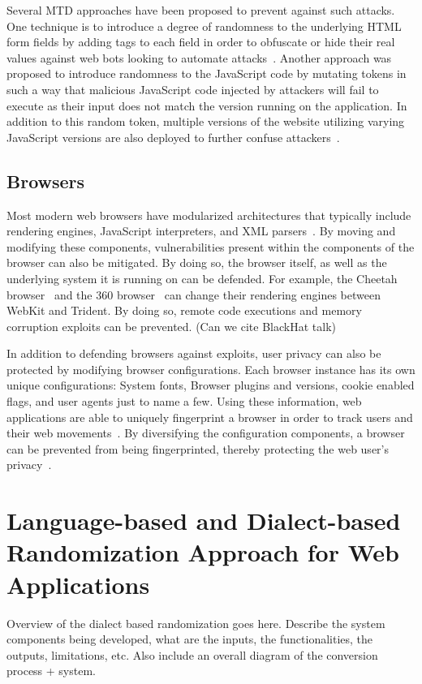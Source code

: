 Several MTD approaches have been proposed to prevent against such attacks. One technique is to introduce a degree of randomness to the underlying HTML form fields by adding tags to each field in order to obfuscate or hide their real values against web bots looking to automate attacks~\cite{vikram2013}.
Another approach was proposed to introduce randomness to the JavaScript code by mutating tokens in such a way that malicious JavaScript code injected by attackers will fail to execute as their input does not match the version running on the application. In addition to this random token, multiple versions of the website utilizing varying JavaScript versions are also deployed to further confuse attackers~\cite{portner2014}.

\subsection{Browsers}
Most modern web browsers have modularized architectures that typically include rendering engines, JavaScript interpreters, and XML parsers~\cite{reis2009browser}.
By moving and modifying these components, vulnerabilities present within the components of the browser can also be mitigated. By doing so, the browser itself, as well as the underlying system it is running on can be defended. For example, the Cheetah browser~\cite{BrowserCheetah} and the 360 browser~\cite{Browser360} can change their rendering engines between WebKit and Trident. By doing so, remote code executions and memory corruption exploits can be prevented. (Can we cite BlackHat talk)%

In addition to defending browsers against exploits, user privacy can also be protected by modifying browser configurations. 
Each browser instance has its own unique configurations: System fonts, Browser plugins and versions, cookie enabled flags, and user agents just to name a few. Using these information, web applications are able to uniquely fingerprint a browser in order to track users and their web movements~\cite{eckersley2010unique}. 
By diversifying the configuration components, a browser can be prevented from being fingerprinted, thereby protecting the web user's privacy~\cite{laperdrixmitigating,nikiforakis15,nikiforakis13}.

\section{Language-based and Dialect-based Randomization Approach for Web Applications}
Overview of the dialect based randomization goes here. Describe the system components being developed, what are the inputs, the functionalities, the outputs, limitations, etc. Also include an overall diagram of the conversion process + system.

